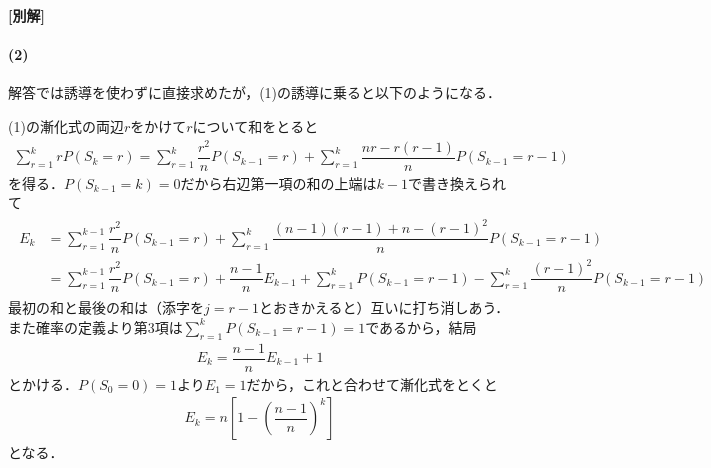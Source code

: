 \documentclass[../../main.tex]{subfiles}
\begin{document}
{\bf [別解]}

\paragraph{(2)}
解答では誘導を使わずに直接求めたが，(1)の誘導に乗ると以下のようになる．

(1)の漸化式の両辺$r$をかけて$r$について和をとると
\begin{align}
  \sum_{r=1}^krP(S_k=r)=\sum_{r=1}^k\dfrac{r^2}{n}P(S_{k-1}=r)+\sum_{r=1}^k\dfrac{nr-r(r-1)}{n}P(S_{k-1}=r-1)
\end{align}
を得る．$P(S_{k-1}=k)=0$だから右辺第一項の和の上端は$k-1$で書き換えられて
\begin{align}
  \begin{split}
    E_k
    &=\sum_{r=1}^{k-1}\dfrac{r^2}{n}P(S_{k-1}=r)+\sum_{r=1}^k\dfrac{(n-1)(r-1)+n-(r-1)^2}{n}P(S_{k-1}=r-1) \\
    &=\sum_{r=1}^{k-1}\dfrac{r^2}{n}P(S_{k-1}=r)+\dfrac{n-1}{n}E_{k-1}+\sum_{r=1}^kP(S_{k-1}=r-1)-\sum_{r=1}^k\dfrac{(r-1)^2}{n}P(S_{k-1}=r-1)
  \end{split}
\end{align}
最初の和と最後の和は（添字を$j=r-1$とおきかえると）互いに打ち消しあう．また確率の定義より第3項は$\displaystyle\sum_{r=1}^kP(S_{k-1}=r-1)=1$であるから，結局
\begin{align}
  E_k=\dfrac{n-1}{n}E_{k-1}+1
\end{align}
とかける．$P(S_0=0)=1$より$E_1=1$だから，これと合わせて漸化式をとくと
\begin{align}
  E_k=n\left[1-\left(\dfrac{n-1}{n}\right)^k\right]
\end{align}
となる．
\end{document}
